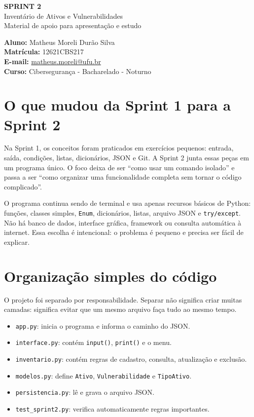 \documentclass[11pt,a4paper]{article}
\begin{document}
\begin{titlepage}
\thispagestyle{empty}
\centering
\vspace*{3.2cm}
{\Large\textbf{SPRINT 2}}\\[0.5cm]
{\LARGE Inventário de Ativos e Vulnerabilidades}\\[1.2cm]
{\large Material de apoio para apresentação e estudo}\\[3.2cm]
\begin{flushleft}
\large
\textbf{Aluno:} Matheus Moreli Durão Silva\\[0.35cm]
\textbf{Matrícula:} 12621CBS217\\[0.35cm]
\textbf{E-mail:} \href{mailto:matheus.moreli@ufu.br}{matheus.moreli@ufu.br}\\[0.35cm]
\textbf{Curso:} Cibersegurança - Bacharelado - Noturno
\end{flushleft}
\vfill
\end{titlepage}

\tableofcontents
\newpage

\section{O que mudou da Sprint 1 para a Sprint 2}

Na Sprint 1, os conceitos foram praticados em exercícios pequenos: entrada, saída, condições, listas, dicionários, JSON e Git. A Sprint 2 junta essas peças em um programa único. O foco deixa de ser ``como usar um comando isolado'' e passa a ser ``como organizar uma funcionalidade completa sem tornar o código complicado''.

O programa continua sendo de terminal e usa apenas recursos básicos de Python: funções, classes simples, \texttt{Enum}, dicionários, listas, arquivo JSON e \texttt{try/except}. Não há banco de dados, interface gráfica, framework ou consulta automática à internet. Essa escolha é intencional: o problema é pequeno e precisa ser fácil de explicar.

\section{Organização simples do código}

O projeto foi separado por responsabilidade. Separar não significa criar muitas camadas: significa evitar que um mesmo arquivo faça tudo ao mesmo tempo.

\begin{itemize}
  \item \texttt{app.py}: inicia o programa e informa o caminho do JSON.
  \item \texttt{interface.py}: contém \texttt{input()}, \texttt{print()} e o menu.
  \item \texttt{inventario.py}: contém regras de cadastro, consulta, atualização e exclusão.
  \item \texttt{modelos.py}: define \texttt{Ativo}, \texttt{Vulnerabilidade} e \texttt{TipoAtivo}.
  \item \texttt{persistencia.py}: lê e grava o arquivo JSON.
  \item \texttt{test\_sprint2.py}: verifica automaticamente regras importantes.
\end{itemize}
\end{document}
